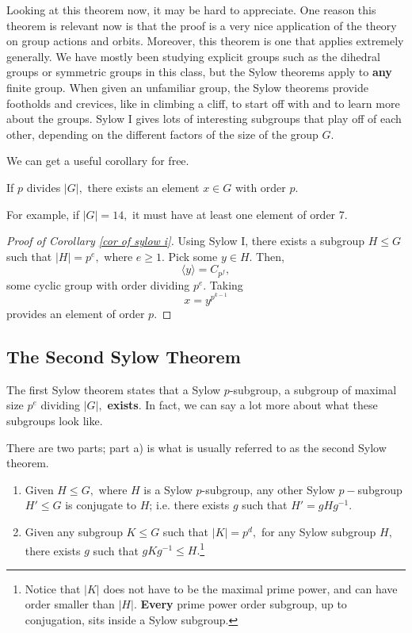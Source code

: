 Looking at this theorem now, it may be hard to appreciate. One reason this theorem is relevant now is that the proof is a very nice application of the theory on group actions and orbits. Moreover, this theorem is one that applies extremely generally. We have mostly been studying explicit groups such as the dihedral groups or symmetric groups in this class, but the Sylow theorems apply to \textbf{any} finite group. When given an unfamiliar group, the Sylow theorems provide footholds and crevices, like in climbing a cliff, to start off with and to learn more about the groups. Sylow I gives lots of interesting subgroups that play off of each other, depending on the different factors of the size of the group $G.$ 

We can get a useful corollary for free. 

\begin{corollary}\label{cor of sylow i}
If $p$ divides $|G|,$ there exists an element $x \in G$ with order $p.$
\end{corollary}

For example, if $|G| = 14,$ it must have at least one element of order 7.

\begin{proof}[Proof of Corollary \ref{cor of sylow i}]

Using Sylow I, there exists a subgroup $H \leq G$ such that $|H| = p^e,$ where $e \geq 1.$ Pick some $y \in H$. Then, \[\langle y \rangle = C_{p^f},\] some cyclic group with order dividing $p^e$. Taking \[x = y^{p^{k-1}}\] provides an element of order $p.$
\end{proof}

\subsection{The Second Sylow Theorem}

The first Sylow theorem states that a Sylow $p$-subgroup, a subgroup of maximal size $p^e$ dividing $|G|,$ \textbf{exists}. In fact, we can say a lot more about what these subgroups look like.  

\begin{theorem}[Sylow II]
There are two parts; part a) is what is usually referred to as the second Sylow theorem.

\begin{enumerate}[label = (\alph*)]
    \item Given $H \leq G,$ where $H$ is a Sylow $p$-subgroup, any other Sylow $p-$subgroup $H' \leq G$ is conjugate to $H$; i.e. there exists $g$ such that $H' = gHg^{-1}$.
    
    \item Given any subgroup $K \leq G$ such that $|K| = p^d,$ for any Sylow subgroup $H,$ there exists $g$ such that $gKg^{-1} \leq H.$\footnote{Notice that $|K|$ does not have to be the maximal prime power, and can have order smaller than $|H|.$ \textbf{Every} prime power order subgroup, up to conjugation, sits inside a Sylow subgroup.}
\end{enumerate}
\end{theorem}

